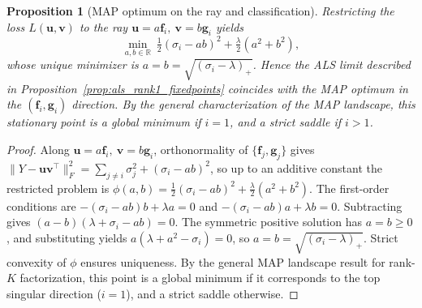 \documentclass[11pt]{article}
\theoremstyle{spaced}
\newtheorem{proposition}{Proposition}
\begin{document}

\begin{proposition}[MAP optimum on the ray and classification]
\label{prop:als_rank1_map}
Restricting the loss $L(\mathbf{u},\mathbf{v})$ to the ray $\mathbf{u}=a \mathbf{f}_i,\ \mathbf{v}=b \mathbf{g}_i$ yields
\[
\min_{a,b\in\mathbb{R}}\ 
\tfrac12(\sigma_i-ab)^2+\tfrac{\lambda}{2}(a^2+b^2),
\]
whose unique minimizer is $a=b=\sqrt{(\sigma_i-\lambda)_+}$.
Hence the ALS limit described in Proposition~\ref{prop:als_rank1_fixedpoints}
coincides with the MAP optimum in the $(\mathbf{f}_i,\mathbf{g}_i)$ direction.
By the general characterization of the MAP landscape, this stationary point is 
a global minimum if $i=1$, and a strict saddle if $i>1$.
\end{proposition}

\begin{proof}
Along $\mathbf{u}=a \mathbf{f}_i,\ \mathbf{v}=b \mathbf{g}_i$, orthonormality of $\{\mathbf{f}_j,\mathbf{g}_j\}$ gives
$\|Y-\mathbf{u}\mathbf{v}^\top\|_F^2=\sum_{j\ne i}\sigma_j^2+(\sigma_i-ab)^2$,
so up to an additive constant the restricted problem is
$\phi(a,b)=\tfrac12(\sigma_i-ab)^2+\tfrac{\lambda}{2}(a^2+b^2)$.
The first-order conditions are
$-(\sigma_i-ab)b+\lambda a=0$ and
$-(\sigma_i-ab)a+\lambda b=0$.
Subtracting gives $(a-b)(\lambda+\sigma_i-ab)=0$.
The symmetric positive solution has $a=b\ge0$, and substituting yields
$a(\lambda+a^2-\sigma_i)=0$, so $a=b=\sqrt{(\sigma_i-\lambda)_+}$.
Strict convexity of $\phi$ ensures uniqueness.
By the general MAP landscape result for rank-$K$ factorization, this point is a
global minimum if it corresponds to the top singular direction ($i=1$), and a strict
saddle otherwise.
\end{proof}

\end{document}
